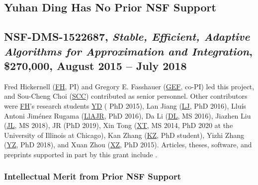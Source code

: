 \documentclass[11pt]{NSFamsart}
\newcommand{\FH}{\hyperlink{FHlink}{FH}\xspace}
\newcommand{\SCTC}{\hyperlink{SCTClink}{SCC}\xspace}
\newcommand{\GEF}{\hyperlink{GEFlink}{GEF}\xspace}
\newcommand{\YD}{\hyperlink{YDlink}{YD}\xspace}
\newcommand{\LlAJR}{\hyperlink{LlAJRlink}{LlAJR}\xspace}
\newcommand{\LJ}{\hyperlink{LJlink}{LJ}\xspace}
\newcommand{\XT}{\hyperlink{XTlink}{XT}\xspace}
\newcommand{\KZ}{\hyperlink{KZlink}{KZ}\xspace}
\newcommand{\DL}{\hyperlink{DLlink}{DL}\xspace}
\newcommand{\XZ}{\hyperlink{XZlink}{XZ}\xspace}
\newcommand{\JL}{\hyperlink{JLlink}{JL}\xspace}
\newcommand{\YZ}{\hyperlink{YZlink}{YZ}\xspace}
\def\abs#1{\ensuremath{\left \lvert #1 \right \rvert}}
\begin{document}
\subsection{Yuhan Ding Has No Prior NSF Support}

\subsection{NSF-DMS-1522687, \emph{Stable, Efficient, Adaptive Algorithms for
			Approximation and Integration},
		\$270,000, August 2015 -- July 2018} \label{sec:PreviousFred}
Fred Hickernell (\FH, PI) and Gregory E. Fasshauer (\GEF, co-PI) led this project, and Sou-Cheng Choi (\SCTC) contributed as senior personnel.  Other contributors were \FH's research students {\YD} ( PhD 2015), \hypertarget{LJlink}{ Lan Jiang } (\LJ, PhD 2016),
\hypertarget{LlAJRlink}{Llu\'is Antoni Jim\'enez Rugama} (\LlAJR, PhD 2016), \hypertarget{DLlink}{Da Li} (\DL, MS 2016), \hypertarget{JLlink}{Jiazhen Liu} (\JL, MS 2018), JR (PhD 2019), \hypertarget{XTlink}{Xin Tong} (\XT, MS 2014, PhD 2020 at the University of Illinois at Chicago), \hypertarget{KZlink}{Kan Zhang} (\KZ, PhD student), \hypertarget{YZlink}{Yizhi Zhang} (\YZ, PhD 2018), and \hypertarget{XZlink}{Xuan Zhou} (\XZ, PhD 2015).  Articles, theses,
software, and preprints supported in
part by this
grant
include
\cite{ala_augmented_2017,
	ChoEtal17a,
	ChoEtal21a,
	Din15a,
	DinHic20a,
	GilEtal16a,
	Hic17a,
	HicJag18b,
	HicJim16a,
	HicEtal18a,
	HicEtal17a,
	HicKriWoz19a,
	RatHic19a,
	GilJim16b,
	JimHic16a,
	JohFasHic18a,
	Li16a,
	Liu17a,
	MarEtal18a,
	mccourt_stable_2017,
	MCCEtal19a,
	mishra_hybrid_2018,
	MisEtal19a,
	rashidinia_stable_2016,
	rashidinia_stable_2018,
	Zha18a,
	Zha17a,
	Zho15a,
	ZhoHic15a}.

\subsubsection{Intellectual Merit from Prior NSF Support}
\label{previousmeritsubsec}

\end{document}

